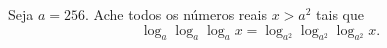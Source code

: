 Seja $a=256$. Ache todos os números reais $x > a^2$ tais que \[\log_a \log_a \log_a x = \log_{a^2} \log_{a^2} \log_{a^2} x.\]
